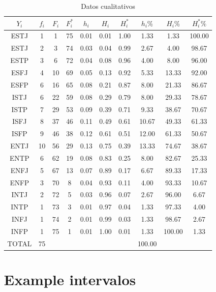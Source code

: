 \documentclass[
  10pt,
]{krantz}
\theoremstyle{definition}
\theoremstyle{definition}
\theoremstyle{definition}
\theoremstyle{definition}
\theoremstyle{remark}
\begin{document}
\begin{longtable}[t]{cccccccccc}
\caption{\label{tab:cualitativa}Datos cualitativos}\\
\toprule
$Y_i$ & $f_i$ & $F_i$ & $F_i^*$ & $h_i$ & $H_i$ & $H_i^*$ & $h_i\%$ & $H_i\%$ & $H_i^*\%$\\
\midrule
ESTJ & 1 & 1 & 75 & 0.01 & 0.01 & 1.00 & 1.33 & 1.33 & 100.00\\
ESTJ & 2 & 3 & 74 & 0.03 & 0.04 & 0.99 & 2.67 & 4.00 & 98.67\\
ESTP & 3 & 6 & 72 & 0.04 & 0.08 & 0.96 & 4.00 & 8.00 & 96.00\\
ESFJ & 4 & 10 & 69 & 0.05 & 0.13 & 0.92 & 5.33 & 13.33 & 92.00\\
ESFP & 6 & 16 & 65 & 0.08 & 0.21 & 0.87 & 8.00 & 21.33 & 86.67\\
ISTJ & 6 & 22 & 59 & 0.08 & 0.29 & 0.79 & 8.00 & 29.33 & 78.67\\
ISTP & 7 & 29 & 53 & 0.09 & 0.39 & 0.71 & 9.33 & 38.67 & 70.67\\
ISFJ & 8 & 37 & 46 & 0.11 & 0.49 & 0.61 & 10.67 & 49.33 & 61.33\\
ISFP & 9 & 46 & 38 & 0.12 & 0.61 & 0.51 & 12.00 & 61.33 & 50.67\\
ENTJ & 10 & 56 & 29 & 0.13 & 0.75 & 0.39 & 13.33 & 74.67 & 38.67\\
ENTP & 6 & 62 & 19 & 0.08 & 0.83 & 0.25 & 8.00 & 82.67 & 25.33\\
ENFJ & 5 & 67 & 13 & 0.07 & 0.89 & 0.17 & 6.67 & 89.33 & 17.33\\
ENFP & 3 & 70 & 8 & 0.04 & 0.93 & 0.11 & 4.00 & 93.33 & 10.67\\
INTJ & 2 & 72 & 5 & 0.03 & 0.96 & 0.07 & 2.67 & 96.00 & 6.67\\
INTP & 1 & 73 & 3 & 0.01 & 0.97 & 0.04 & 1.33 & 97.33 & 4.00\\
INFJ & 1 & 74 & 2 & 0.01 & 0.99 & 0.03 & 1.33 & 98.67 & 2.67\\
INFP & 1 & 75 & 1 & 0.01 & 1.00 & 0.01 & 1.33 & 100.00 & 1.33\\
TOTAL & 75 &  &  &  &  &  & 100.00 &  & \\
\bottomrule
\end{longtable}

\hypertarget{example-intervalos}{%
\section{Example intervalos}\label{example-intervalos}}
\end{document}
